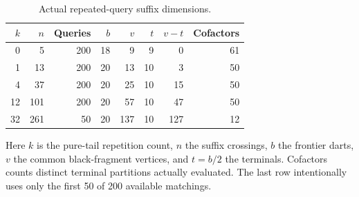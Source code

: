\begin{table}[htbp]
\centering\small
\caption{Actual repeated-query suffix dimensions.}
\label{tab:dimensions}
\begin{tabular}{@{}rrrrrrrr@{}}
\toprule
$k$ & $n$ & Queries & $b$ & $v$ & $t$ & $v-t$ & Cofactors\\
\midrule
0 & 5 & 200 & 18 & 9 & 9 & 0 & 61\\
1 & 13 & 200 & 20 & 13 & 10 & 3 & 50\\
4 & 37 & 200 & 20 & 25 & 10 & 15 & 50\\
12 & 101 & 200 & 20 & 57 & 10 & 47 & 50\\
32 & 261 & 50 & 20 & 137 & 10 & 127 & 12\\
\bottomrule
\end{tabular}
\par\smallskip\begin{minipage}{0.97\textwidth}\footnotesize
Here $k$ is the pure-tail repetition count, $n$ the suffix crossings, $b$ the frontier darts, $v$ the common black-fragment vertices, and $t=b/2$ the terminals. Cofactors counts distinct terminal partitions actually evaluated. The last row intentionally uses only the first 50 of 200 available matchings.
\end{minipage}
\end{table}
